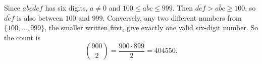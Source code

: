 Since $\overline{abcdef}$ has six digits, $a\ne0$ and $100\le\overline{abc}\le999$. Then $\overline{def}>\overline{abc}\ge100$, so $\overline{def}$ is also between $100$ and $999$. Conversely, any two different numbers from $\{100,\dots,999\}$, the smaller written first, give exactly one valid six-digit number. So the count is
\[
\binom{900}{2}=\dfrac{900\cdot899}{2}=\boxed{404550}.
\]
